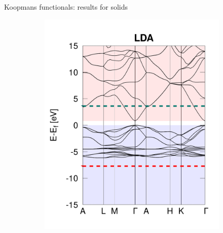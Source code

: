 \documentclass[xcolor=table,aspectratio=169]{beamer}
\numberwithin{equation}{section}
\begin{document}
\begin{frame}{Koopmans functionals: results for solids}
   \begin{figure}[t]
      \centering
      \begin{subfigure}{0.3\textwidth}
         \includegraphics[width=\columnwidth]{figures/ZnO_lda.png}
      \end{subfigure}
      \begin{subfigure}{0.3\textwidth}

\end{subfigure}
\end{figure}
\end{frame}
\end{document}
